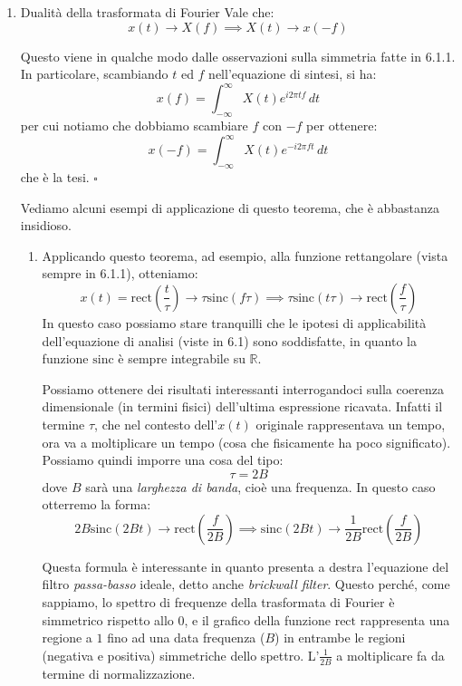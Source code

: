 \documentclass[a4paper,11pt]{article}
\begin{document}
\begin{enumerate}
\item \begin{theorem}{Dualità della trasformata di Fourier}
Vale che:
$$
x(t) \rightarrow X(f) \implies X(t) \rightarrow x(-f)
$$
\end{theorem}
Questo viene in qualche modo dalle osservazioni sulla simmetria fatte in 6.1.1. In particolare, scambiando $t$ ed $f$ nell'equazione di sintesi, si ha:
$$
x(f) = \int_{-\infty}^{\infty} X(t) e^{i 2 \pi t f} \, dt
$$
per cui notiamo che dobbiamo scambiare $f$ con $-f$ per ottenere:
$$
x(-f) = \int_{-\infty}^{\infty} X(t) e^{-i 2 \pi f t} \, dt
$$
che è la tesi. \hfill $\square$

Vediamo alcuni esempi di applicazione di questo teorema, che è abbastanza insidioso.
\begin{enumerate}
	\item
Applicando questo teorema, ad esempio, alla funzione rettangolare (vista sempre in 6.1.1), otteniamo:
$$
x(t) = \mathrm{rect} \left( \frac{t}{\tau} \right) \rightarrow \tau \mathrm{sinc} (f \tau) \implies \tau \mathrm{sinc} (t \tau) \rightarrow \mathrm{rect} \left(\frac{f}{\tau}\right) 
$$
In questo caso possiamo stare tranquilli che le ipotesi di applicabilità dell'equazione di analisi (viste in 6.1) sono soddisfatte, in quanto la funzione $\mathrm{sinc}$ è sempre integrabile su $\mathbb{R}$.

Possiamo ottenere dei risultati interessanti interrogandoci sulla coerenza dimensionale (in termini fisici) dell'ultima espressione ricavata. Infatti il termine $\tau$, che nel contesto dell'$x(t)$ originale rappresentava un tempo, ora va a moltiplicare un tempo (cosa che fisicamente ha poco significato). Possiamo quindi imporre una cosa del tipo:
$$
\tau = 2 B
$$
dove $B$ sarà una \textit{larghezza di banda}, cioè una frequenza. In questo caso otterremo la forma:
$$
2B \mathrm{sinc} (2Bt) \rightarrow \mathrm{rect} \left( \frac{f}{2B} \right) \implies
\mathrm{sinc} (2Bt) \rightarrow \frac{1}{2B} \mathrm{rect} \left( \frac{f}{2B} \right)
$$

Questa formula è interessante in quanto presenta a destra l'equazione del filtro \textit{passa-basso} ideale, detto anche \textit{brickwall filter}. Questo perché, come sappiamo, lo spettro di frequenze della trasformata di Fourier è simmetrico rispetto allo 0, e il grafico della funzione $\mathrm{rect}$ rappresenta una regione a $1$ fino ad una data frequenza ($B$) in entrambe le regioni (negativa e positiva) simmetriche dello spettro. L'$\frac{1}{2B}$ a moltiplicare fa da termine di normalizzazione.


\end{enumerate}
\end{enumerate}
\end{document}

